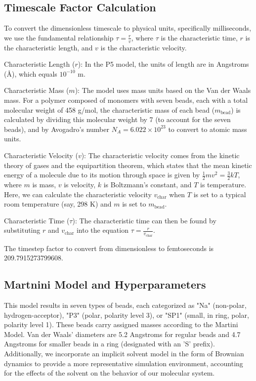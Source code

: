 \documentclass{article}
\theoremstyle{plain}
\theoremstyle{definition}
\theoremstyle{remark}
\begin{document}
\subsection{Timescale Factor Calculation}
To convert the dimensionless timescale to physical units, specifically milliseconds, we use the fundamental relationship $\tau = \frac{r}{v}$, where $\tau$ is the characteristic time, $r$ is the characteristic length, and $v$ is the characteristic velocity.

    Characteristic Length ($r$): In the P5 model, the units of length are in Angstroms (Å), which equals $10^{-10}$ m.

    Characteristic Mass ($m$): The model uses mass units based on the Van der Waals mass. For a polymer composed of monomers with seven beads, each with a total molecular weight of 458 g/mol, the characteristic mass of each bead ($m_{\text{bead}}$) is calculated by dividing this molecular weight by 7 (to account for the seven beads), and by Avogadro's number $N_A = 6.022 \times 10^{23}$ to convert to atomic mass units.

    Characteristic Velocity ($v$): The characteristic velocity comes from the kinetic theory of gases and the equipartition theorem, which states that the mean kinetic energy of a molecule due to its motion through space is given by $\frac{1}{2} m v^2 = \frac{3}{2} kT$, where $m$ is mass, $v$ is velocity, $k$ is Boltzmann's constant, and $T$ is temperature. Here, we can calculate the characteristic velocity $v_{\text{char}}$ when $T$ is set to a typical room temperature (say, 298 K) and $m$ is set to $m_{\text{bead}}$.

    Characteristic Time ($\tau$): The characteristic time can then be found by substituting $r$ and $v_{\text{char}}$ into the equation $\tau = \frac{r}{v_{\text{char}}}$.

    The timestep factor to convert from dimensionless to femtoseconds is 209.7915273799608.

\subsection{Martnini Model and Hyperparameters}

This model results in seven types of beads, each categorized as "Na" (non-polar, hydrogen-acceptor), "P3" (polar, polarity level 3), or "SP1" (small, in ring, polar, polarity level 1). These beads carry assigned masses according to the Martini Model. Van der Waals' diameters are 5.2 Angstroms for regular beads and 4.7 Angstroms for smaller beads in a ring (designated with an 'S' prefix). Additionally, we incorporate an implicit solvent model in the form of Brownian dynamics to provide a more representative simulation environment, accounting for the effects of the solvent on the behavior of our molecular system.
\end{document}
